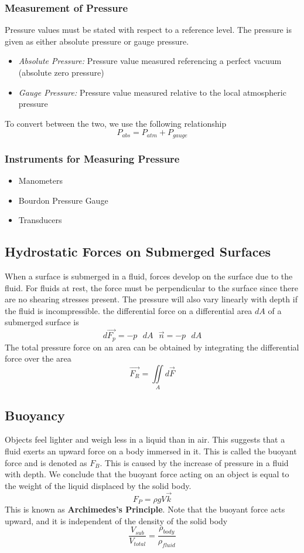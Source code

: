 \documentclass[11pt]{article}
\begin{document}
\subsubsection{Measurement of Pressure}
Pressure values must be stated with respect to a reference level. The pressure is given as either absolute pressure or gauge pressure.
\begin{itemize}
\item \textit{Absolute Pressure:} Pressure value measured referencing a perfect vacuum (absolute zero pressure)
\item \textit{Gauge Pressure:} Pressure value measured relative to the local atmospheric pressure
\end{itemize}
To convert between the two, we use the following relationship
$$ P_{abs} = P_{atm} + P_{gauge}$$
\subsubsection{Instruments for Measuring Pressure}
\begin{itemize}
\item Manometers
\item Bourdon Pressure Gauge
\item Transducers
\end{itemize}
\subsection{Hydrostatic Forces on Submerged Surfaces}
When a surface is submerged in a fluid, forces develop on the surface due to the fluid. For fluids at rest, the force must be perpendicular to the surface since there are no shearing stresses present. The pressure will also vary linearly with depth if the fluid is incompressible. the differential force on a differential area $dA$ of a submerged surface is 
$$ d\vec{F_p} = -p\text{ } dA \text{ } \vec{n} = -p \text{ } dA $$
The total pressure force on an area can be obtained by integrating the differential force over the area
$$\vec{F_R} = \iint\limits_{A} d\vec{F}$$
\subsection{Buoyancy}
Objects feel lighter and weigh less in a liquid than in air. This suggests that a fluid exerts an upward force on a body immersed in it. This is called the buoyant force and is denoted as $F_B$. This is caused by the increase of pressure in a fluid with depth. We conclude that the buoyant force acting on an object is equal to the weight of the liquid displaced by the solid body. 
$$ F_P = \rho g V \vec{k} $$
This is known as \textbf{Archimedes's Principle}. Note that the buoyant force acts upward, and it is independent of the density of the solid body
$$ \frac{V_{sub}}{V_{total}} = \frac{\rho_{body}}{\rho_{fluid}}$$
\end{document}
